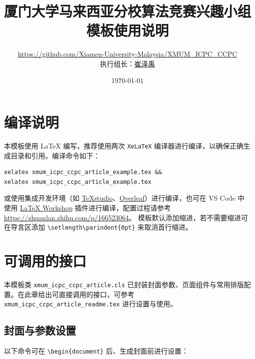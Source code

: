 \documentclass{xmum_icpc_ccpc_article}
\title{厦门大学马来西亚分校算法竞赛兴趣小组\\模板使用说明}
\author{
    \url{https://github.com/Xiamen-University-Malaysia/XMUM_ICPC_CCPC}\\
    \small 执行组长：\href{mailto:zeyu1024@outlook.com}{崔泽禹}}
\date{\today}
\begin{document}

\XMUMMakeCoverWithBackground
\XMUMMakeCover

\newpage
\maketitle
\tableofcontents
\thispagestyle{titlepage}

\newpage
{}

\pagestyle{fancy}

\section{编译说明}
\noindent 本模板使用 \LaTeX{} 编写，推荐使用两次 \texttt{XeLaTeX} 编译器进行编译，以确保正确生成目录和引用。编译命令如下：
\begin{verbatim}xelatex xmum_icpc_ccpc_article_example.tex && 
xelatex xmum_icpc_ccpc_article_example.tex
\end{verbatim}
\noindent 或使用集成开发环境（如 \href{https://texstudio.sourceforge.net}{TeXstudio}、\href{https://www.overleaf.com/project}{Overleaf}）进行编译，也可在 VS Code 中使用 \href{https://marketplace.visualstudio.com/items?itemName=James-Yu.latex-workshop}{LaTeX Workshop} 插件进行编译，配置过程请参考 \url{https://zhuanlan.zhihu.com/p/166523064}。
\noindent 模板默认添加缩进，若不需要缩进可在导言区添加 \verb|\setlength\parindent{0pt}| 来取消首行缩进。

\section{可调用的接口}
\noindent 本模板类 \texttt{xmum\_icpc\_ccpc\_article.cls} 已封装封面参数、页面组件与常用排版配置。在此章给出可直接调用的接口，可参考 \texttt{xmum\_icpc\_ccpc\_article\_readme.tex} 进行设置与使用。

\subsection{封面与参数设置}
\noindent 以下命令可在 \verb|\begin{document}| 后、生成封面前进行设置：
\end{document}
